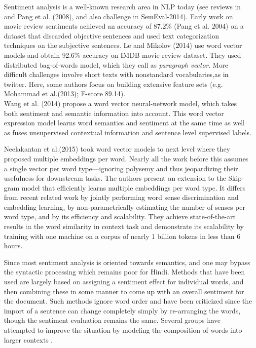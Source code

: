 \documentclass[11pt,a4paper]{article}
\begin{document}
Sentiment analysis is a well-known research area in NLP today (see reviews in~\cite{Liu:12} and Pang et al. (2008), and also
challenge in SemEval-2014).  Early work on movie review sentiments achieved an accuracy of 87.2\% (Pang et al. 2004) on a dataset that discarded objective sentences and used text categorization techniques
on the subjective sentences. Le and Mikolov (2014) use word vector models and obtain 92.6\% accuracy on IMDB movie review dataset.
They used distributed bag-of-words model, which they call as \emph{paragraph vector}. More difficult challenges involve short texts with nonstandard vocabularies,as in twitter.  Here, some authors focus on building extensive feature sets (e.g. Mohammad et al.(2013); F-score 89.14). \\
Wang et al. (2014) propose a word vector neural-network model, which takes both sentiment and semantic information into account. This word vector expression model learns word semantics and sentiment at the same time as well as fuses unsupervised contextual information and sentence level supervised labels.

Neelakantan et al.(2015)\cite{Neelakantan:14} took word vector models to next level where they proposed multiple embeddings per word. Nearly all the work before this assumes a single vector per word
type—ignoring polysemy and thus jeopardizing their usefulness for downstream tasks. The authors present an extension to the Skip-gram model that efficiently learns multiple embeddings per word type. It differs from recent related work by jointly performing word sense discrimination and embedding learning, by non-parametrically estimating the number of senses per word type, and by its efficiency and scalability. They achieve state-of-the-art results in the word similarity in context task and demonstrate its scalability by training with one machine on a corpus of nearly 1 billion tokens in less than 6 hours.

Since most sentiment analysis is oriented towards semantics, and one may bypass the syntactic
processing which remains poor for Hindi. Methods that have been used are largely based on assigning a sentiment effect for individual words, and then combining these in some manner to come up with an overall sentiment for the document. Such methods ignore word order and have been criticized since the import of a sentence can change completely simply by re-arranging the words, though the sentiment evaluation remains the same. Several groups have attempted to improve the situation by modeling the composition of words into larger contexts \cite{Le:14,Socher:13,Johnson:14,Baroni:14}.
\end{document}
